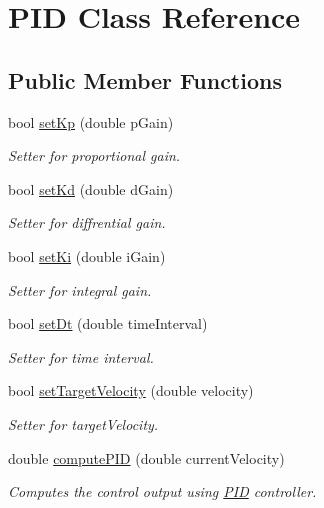 \hypertarget{classPID}{}\section{P\+ID Class Reference}
\label{classPID}
\subsection*{Public Member Functions}
\begin{DoxyCompactItemize}
\item 
bool \hyperlink{classPID_af2a06a6aacd89993347f6adbc906e9a2}{set\+Kp} (double p\+Gain)
\begin{DoxyCompactList}\small\item\em Setter for proportional gain. \end{DoxyCompactList}\item 
bool \hyperlink{classPID_a91359adee27385a381690ae548afe976}{set\+Kd} (double d\+Gain)
\begin{DoxyCompactList}\small\item\em Setter for diffrential gain. \end{DoxyCompactList}\item 
bool \hyperlink{classPID_af0d5d19e1657530e1cbca6ed675629e0}{set\+Ki} (double i\+Gain)
\begin{DoxyCompactList}\small\item\em Setter for integral gain. \end{DoxyCompactList}\item 
bool \hyperlink{classPID_a182527b0cc7c5869fbb14508b9b35c41}{set\+Dt} (double time\+Interval)
\begin{DoxyCompactList}\small\item\em Setter for time interval. \end{DoxyCompactList}\item 
bool \hyperlink{classPID_a430bbe62eb2f904eb45ce081d96dc294}{set\+Target\+Velocity} (double velocity)
\begin{DoxyCompactList}\small\item\em Setter for target\+Velocity. \end{DoxyCompactList}\item 
double \hyperlink{classPID_aa7eaae8c7f3a11bb4d53ff8ee17df10f}{compute\+P\+ID} (double current\+Velocity)
\begin{DoxyCompactList}\small\item\em Computes the control output using \hyperlink{classPID}{P\+ID} controller. \end{DoxyCompactList}\end{DoxyCompactItemize}


